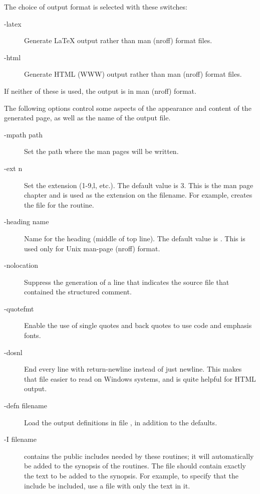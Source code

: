 \documentclass[twoside]{../texlocal/linfoem}
\begin{document}
The choice of output format is selected with these switches:
\begin{description}
\item[-latex]
Generate LaTeX output rather than man (nroff) format files.
\item[-html]
Generate HTML (WWW) output rather than man (nroff) format files.
\end{description}
If neither of these is used, the output is in man (nroff) format.

The following options control some aspects of the appearance and content of the
generated page, as well as the name of the output file.
\begin{description}
\item[-mpath path]
Set the path where the man pages will be written.
\item[-ext n]
Set the extension (1-9,l, etc.).  The default value is 3.  This is the man page
chapter and is used as the extension on the filename.  For example,
 creates the file  for the  routine.
\item[-heading name]
Name for the heading (middle of top line).  The default value is .
This is used only for Unix man-page (nroff) format.
\item[-nolocation]
Suppress the generation of a line that indicates the source file that
contained the structured comment.
\item[-quotefmt]
Enable the use of single quotes and back quotes to use code and emphasis
fonts.
\item[-dosnl]
End every line with return-newline instead of just newline.  This makes that
file easier to read on Windows systems, and is quite helpful for HTML output.
\item[-defn filename]Load the output definitions in file , in
  addition to the defaults.  
\item[-I filename]
 contains the public includes needed by these routines; it will
automatically be added to the synopsis of the routines.  The file should
contain exactly the text to be added to the synopsis.  For example, to specify
that the include  be included, use a file with only the text
 in it.
\end{description}
\end{document}
